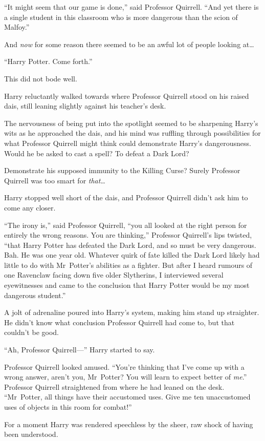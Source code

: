 “It might seem that our game is done,” said Professor Quirrell. “And yet there is a single student in this classroom who is more dangerous than the scion of Malfoy.”

And \emph{now} for some reason there seemed to be an awful lot of people looking at…

“Harry Potter. Come forth.”

This did not bode well.

Harry reluctantly walked towards where Professor Quirrell stood on his raised dais, still leaning slightly against his teacher’s desk.

The nervousness of being put into the spotlight seemed to be sharpening Harry’s wits as he approached the dais, and his mind was ruffling through possibilities for what Professor Quirrell might think could demonstrate Harry’s dangerousness. Would he be asked to cast a spell? To defeat a Dark Lord?

Demonstrate his supposed immunity to the Killing Curse? Surely Professor Quirrell was too smart for \emph{that}…

Harry stopped well short of the dais, and Professor Quirrell didn’t ask him to come any closer.

“The irony is,” said Professor Quirrell, “you all looked at the right person for entirely the wrong reasons. You are thinking,” Professor Quirrell’s lips twisted, “that Harry Potter has defeated the Dark Lord, and so must be very dangerous. Bah. He was one year old. Whatever quirk of fate killed the Dark Lord likely had little to do with Mr~Potter’s abilities as a fighter. But after I heard rumours of one Ravenclaw facing down five older Slytherins, I interviewed several eyewitnesses and came to the conclusion that Harry Potter would be my most dangerous student.”

A jolt of adrenaline poured into Harry’s system, making him stand up straighter. He didn’t know what conclusion Professor Quirrell had come to, but that couldn’t be good.

“Ah, Professor Quirrell—” Harry started to say.

Professor Quirrell looked amused. “You’re thinking that I’ve come up with a wrong answer, aren’t you, Mr~Potter? You will learn to expect better of \emph{me}.” Professor Quirrell straightened from where he had leaned on the desk. “Mr~Potter, all things have their accustomed uses. Give me ten unaccustomed uses of objects in this room for combat!”

For a moment Harry was rendered speechless by the sheer, raw shock of having been understood.

